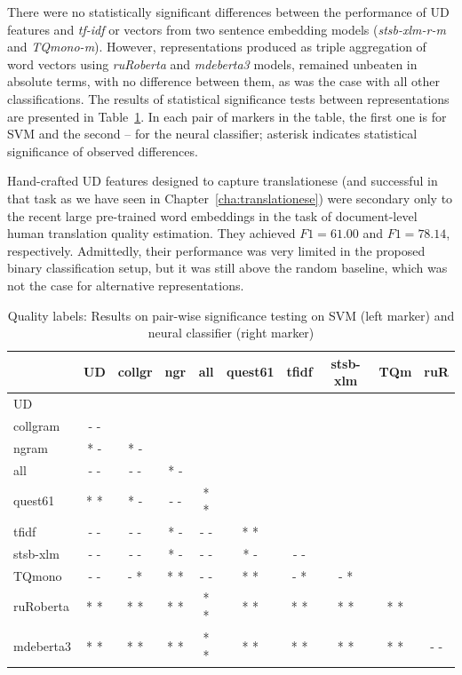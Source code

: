 There were no statistically significant differences between the performance of UD features and \textit{tf-idf} or vectors from two sentence embedding models (\textit{stsb-xlm-r-m} and \textit{TQmono-m}).
However, representations produced as triple aggregation of word vectors using \textit{ruRoberta} and \textit{mdeberta3} models, remained unbeaten in absolute terms, with no difference between them, as was the case with all other classifications. 
The results of statistical significance tests between representations are presented in Table~\ref{tab:sign_tests_qua_labels}. In each pair of markers in the table, the first one is for SVM and the second -- for the neural classifier; asterisk indicates statistical significance of observed differences.

Hand-crafted UD features designed to capture translationese (and successful in that task as we have seen in Chapter~\ref{cha:translationese}) were secondary only to the recent large pre-trained word embeddings in the task of document-level human translation quality estimation. 
They achieved $F1=61.00$ and $F1=78.14$, respectively.
Admittedly, their performance was very limited in the proposed binary classification setup, but it was still above the random baseline, which was not the case for alternative representations. 

\begin{table}[H]
		\centering
	\begin{tabular}{l|ccccccccc}
		\toprule
						& UD  & collgr & ngr & all & quest61  & tfidf & stsb-xlm & TQm & ruR \\
		\midrule
		UD              &     &      &    &         &         &       &  &   & \\
		collgram        & - - &      &    &         &         &       &  &  & \\
		ngram           & * - & * -  &    &         &         &       &   &    & \\
		all             & - - & - -  & * - &        &         &       &    & & \\
		quest61         & * * & * -  & - - & * *    &         &       &  & &  \\
		tfidf           & - - & - -  & * - & - -    & * *     &       &    &  &  \\
		stsb-xlm        & - - & - -  & * - & - -    & * -     & - -   &      &    &    \\
		TQmono          & - - & - *  & * * & - -    & * *     & - *   & - *  &      & \\
		ruRoberta       & * * & * *  & * * & * *    & * *     & * *   & * *  & * *  &   \\
		mdeberta3       & * * & * *  & * * & * *    & * *     & * *   & * *  & * *  & - - \\           
			\bottomrule
	\end{tabular}
	\caption{\label{tab:sign_tests_qua_labels}Quality labels: Results on pair-wise significance testing on SVM (left marker) and neural classifier (right marker)}
\end{table}

